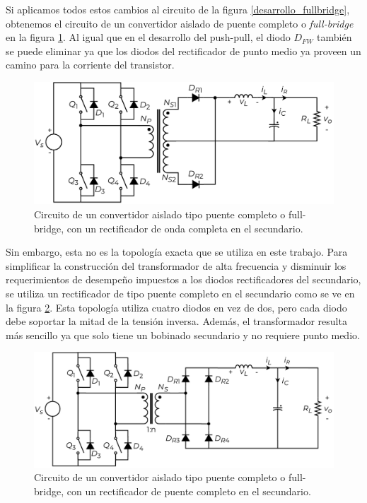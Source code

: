 Si aplicamos todos estos cambios al circuito de la figura \ref{desarrollo_fullbridge}, obtenemos el circuito de un {\Medium convertidor aislado de puente completo} o {\Medium \textit{full-bridge}} en la figura \ref{fullbridge_partido}. Al igual que en el desarrollo del push-pull, el diodo $D_{FW}$ también se puede eliminar ya que los diodos del rectificador de punto medio ya proveen un camino para la corriente del transistor.\\

\begin{figure}[H]
    \centering
    \includegraphics[scale=0.6]{Imagenes/Full Bridge Onda Completa.pdf}
    \caption{Circuito de un convertidor aislado tipo puente completo o full-bridge, con un rectificador de onda completa en el secundario.}
    \label{fullbridge_partido}
\end{figure}

Sin embargo, esta no es la topología exacta que se utiliza en este trabajo. Para simplificar la construcción del transformador de alta frecuencia y disminuir los requerimientos de desempeño impuestos a los diodos rectificadores del secundario, se utiliza un {\Medium rectificador de tipo puente completo} en el secundario como se ve en la figura \ref{fullbridge}. Esta topología utiliza cuatro diodos en vez de dos, pero cada diodo debe soportar la mitad de la tensión inversa. Además, el transformador resulta más sencillo ya que solo tiene un bobinado secundario y no requiere punto medio.\\

\begin{figure}[h]
    \centering
    \includegraphics[scale=0.6]{Imagenes/Full Bridge.pdf}
    \caption{Circuito de un convertidor aislado tipo puente completo o full-bridge, con un rectificador de puente completo en el secundario.}
    \label{fullbridge}
\end{figure}

